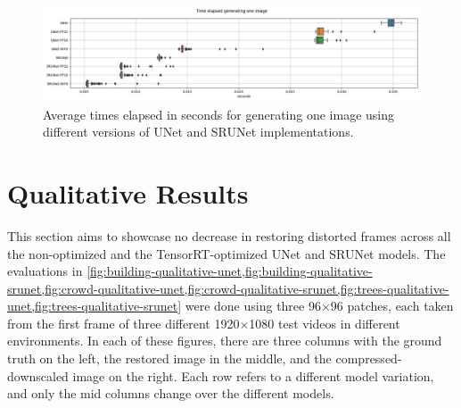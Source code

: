 \begin{figure}[ht]
\includegraphics[width=1.0\textwidth]{static/boxplots_timings.jpg}
\caption{Average times elapsed in seconds for generating one image using different versions of UNet and SRUNet implementations.}
\label{fig:timings}
\end{figure}


\clearpage

\section{Qualitative Results}
\label{sec:qualitative-results}

This section aims to showcase no decrease in restoring distorted frames across all the non-optimized and the TensorRT-optimized UNet and SRUNet models. The evaluations in \cref{fig:building-qualitative-unet,fig:building-qualitative-srunet,fig:crowd-qualitative-unet,fig:crowd-qualitative-srunet,fig:trees-qualitative-unet,fig:trees-qualitative-srunet} were done using three 96$\times$96 patches, each taken from the first frame of three different 1920$\times$1080 test videos in different environments. In each of these figures, there are three columns with the ground truth on the left, the restored image in the middle, and the compressed-downscaled image on the right. Each row refers to a different model variation, and only the mid columns change over the different models.


